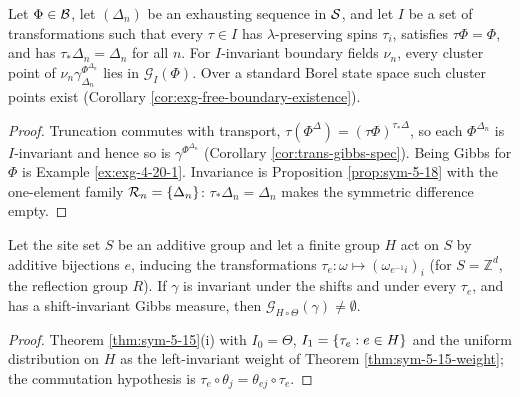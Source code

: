 \begin{theorem}
    \label{thm:sym-5-20-2}
    \leanok

    Let $\Phi \in \mathcal{B}$, let $(\Delta_n)$ be an exhausting sequence in $\mathcal{S}$, and let $I$ be
    a set of transformations such that every $\tau \in I$ has $\lambda$-preserving spins
    $\tau_i$, satisfies $\tau\Phi = \Phi$, and has $\tau_*\Delta_n = \Delta_n$ for all $n$. For
    $I$-invariant boundary fields $\nu_n$, every cluster point of
    $\nu_n \gamma^{\Phi^{\Delta_n}}_{\Delta_n}$ lies in $\mathcal{G}_I(\Phi)$. Over a standard
    Borel state space such cluster points exist
    (Corollary \ref{cor:exg-free-boundary-existence}).
\end{theorem}
\begin{proof}
    \leanok

    Truncation commutes with transport, $\tau(\Phi^\Delta) = (\tau\Phi)^{\tau_*\Delta}$, so each
    $\Phi^{\Delta_n}$ is $I$-invariant and hence so is $\gamma^{\Phi^{\Delta_n}}$
    (Corollary \ref{cor:trans-gibbs-spec}). Being Gibbs for $\Phi$ is
    Example \ref{ex:exg-4-20-1}. Invariance is Proposition \ref{prop:sym-5-18} with the
    one-element family $\mathcal{R}_n = \left\{ \Delta_n \right\}$: $\tau_*\Delta_n = \Delta_n$ makes the
    symmetric difference empty.
\end{proof}

\begin{theorem}
    \label{thm:sym-5-17-2}
    \leanok

    Let the site set $S$ be an additive group and let a finite group $H$ act on $S$ by additive
    bijections $e$, inducing the transformations $\tau_e : \omega \mapsto (\omega_{e^{-1}i})_i$
    (for $S = \mathbb{Z}^d$, the reflection group $R$). If $\gamma$ is invariant under the
    shifts and under every $\tau_e$, and has a shift-invariant Gibbs measure, then
    $\mathcal{G}_{H \circ \Theta}(\gamma) \neq \emptyset$.
\end{theorem}
\begin{proof}
    \leanok

    Theorem \ref{thm:sym-5-15}(i) with $I_0 = \Theta$, $I_1 = \left\{ \tau_e : e \in H \right\}$ and the
    uniform distribution on $H$ as the left-invariant weight of
    Theorem \ref{thm:sym-5-15-weight}; the commutation hypothesis is
    $\tau_e \circ \theta_j = \theta_{ej} \circ \tau_e$.
\end{proof}

